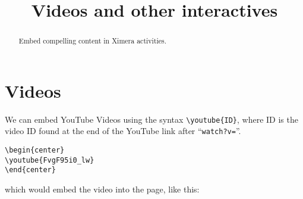 \documentclass{ximera}
\title{Videos and other interactives}
\begin{document}
\begin{abstract}
  Embed compelling content in Ximera activities.
\end{abstract}
\maketitle

\section{Videos}

We can embed YouTube Videos using the syntax \verb|\youtube{ID}|, where ID
is the video ID found at the end of the YouTube link after ``\texttt{watch?v=}''.
\begin{verbatim}
\begin{center}
\youtube{FvgF95i0_lw}
\end{center}
\end{verbatim}
which would embed the video into the page, like this:
\begin{center}
\end{center}
\end{document}
